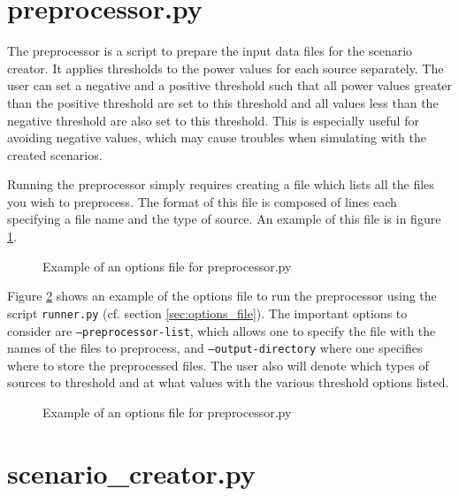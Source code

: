 \documentclass[11pt]{article}
\begin{document}
\section{preprocessor.py}\label{sec:preprocessor}

The preprocessor is a script to prepare the input data files for the scenario creator. It applies thresholds to the power values for each source separately. The user can set a negative and a positive threshold such that all power values greater than the positive threshold are set to this threshold and all values less than the negative threshold are also set to this threshold. This is especially useful for avoiding negative values, which may cause troubles when simulating with the created scenarios.

Running the preprocessor simply requires creating a file which lists all the files you wish to preprocess. 
The format of this file is composed of lines each specifying a file name and the type of source.
An example of this file is in figure \ref{fig:list_of_files.txt}.

\begin{figure}[H]
	\begin{framed}
		
	\end{framed}
	\caption{Example of an options file for preprocessor.py}
	\label{fig:list_of_files.txt}
\end{figure}

Figure \ref{fig:run_preprocessor} shows an example of the options file to run the preprocessor using the script \texttt{runner.py} (cf. section \ref{sec:options_file}). The important options to consider are \texttt{--preprocessor-list}, which allows one to specify the file with the names of the files to preprocess, and \texttt{--output-directory} where one specifies where to store the preprocessed files. The user also will denote which types of sources to threshold and at what values with the various threshold options listed.

\begin{figure}[H]
	\begin{framed}
		
	\end{framed}
	\caption{Example of an options file for preprocessor.py}
	\label{fig:run_preprocessor}
\end{figure}

\section{scenario\_creator.py}\label{sec:scenario_creator}
\end{document}
